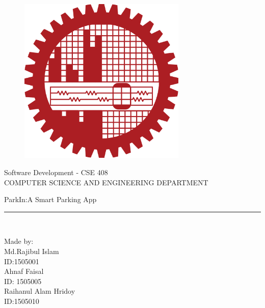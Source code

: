 \documentclass[12pt, english]{article}
\begin{document}
\begin{titlepage}

\begin{center}
\vspace*{-1in}
\begin{figure}[htb]
\begin{center}
\includegraphics[width=8cm]{logo}
\end{center}
\end{figure}

Software Development -  CSE 408\\
\vspace*{0.15in}
COMPUTER SCIENCE AND ENGINEERING DEPARTMENT \\
\vspace*{0.4in}
\begin{large}
ParkIn:A Smart Parking App\\
\end{large}
\vspace*{0.2in}
\rule{80mm}{0.1mm}\\
\vspace*{0.1in}
\begin{large}
Made by: \\
Md.Rajibul Islam\\
ID:1505001\\
Ahnaf Faisal \\
ID: 1505005 \\
Raihanul Alam Hridoy\\
ID:1505010
\end{large}
\end{center}
\end{titlepage}
\end{document}
